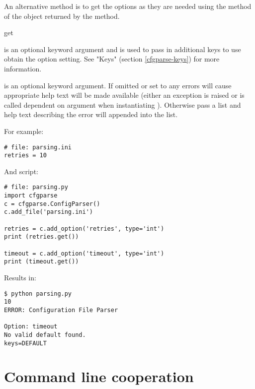 \documentclass{howto}
\begin{document}
An alternative method is to get the options as they are needed using the
 method of the object returned by the  method.

  \begin{funcdesc}{get}{}

     is an optional keyword argument and is used to pass in 
        additional keys to use obtain the option setting.  
        See "Keys" (section \ref{cfgparse-keys}) for more information.
    
     is an optional keyword argument.  If omitted or set to
         any errors will cause appropriate help text will be 
        made available (either an exception is raised or 
         is called dependent on  
        argument when instantiating ).  Otherwise 
        pass a list and help text describing the error will appended 
        into the list.
  \end{funcdesc}

For example:

\begin{verbatim}
# file: parsing.ini
retries = 10
\end{verbatim}

And script:

\begin{verbatim}
# file: parsing.py
import cfgparse
c = cfgparse.ConfigParser()
c.add_file('parsing.ini')

retries = c.add_option('retries', type='int')
print (retries.get())

timeout = c.add_option('timeout', type='int')
print (timeout.get())
\end{verbatim}

Results in:

\begin{verbatim}
$ python parsing.py
10
ERROR: Configuration File Parser

Option: timeout
No valid default found.
keys=DEFAULT
\end{verbatim}
  
\section{Command line cooperation\label{cfgparse-cmd-line-coop}}
\end{document}
